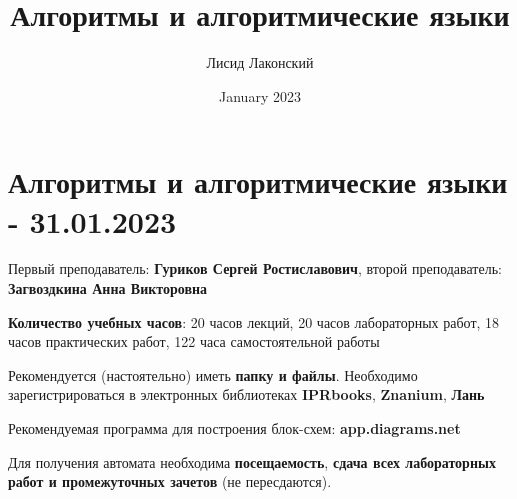 \documentclass{article}
\title{Алгоритмы и алгоритмические языки}
\author{Лисид Лаконский}
\date{January 2023}
\begin{document}
\raggedright

\maketitle
\tableofcontents
\pagebreak

\section{Алгоритмы и алгоритмические языки - 31.01.2023}

Первый преподаватель: \textbf{Гуриков Сергей Ростиславович}, второй преподаватель: \textbf{Загвоздкина Анна Викторовна}

\hfill

\textbf{Количество учебных часов}: 20 часов лекций, 20 часов лабораторных работ, 18 часов практических работ, 122 часа самостоятельной работы

\hfill

Рекомендуется (настоятельно) иметь \textbf{папку и файлы}. Необходимо зарегистрироваться в электронных библиотеках \textbf{IPRbooks},  \textbf{Znanium}, \textbf{Лань}

Рекомендуемая программа для построения блок-схем: \textbf{app.diagrams.net}

\hfill

Для получения автомата необходима \textbf{посещаемость}, \textbf{сдача всех лабораторных работ и промежуточных зачетов} (не пересдаются).
\end{document}
